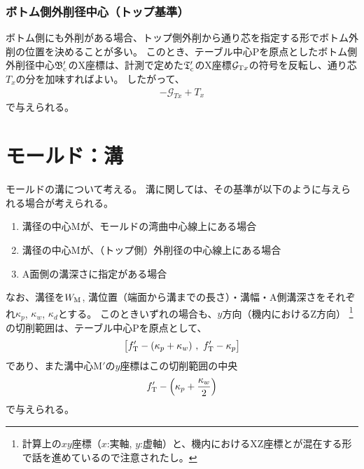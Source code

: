 \subsection{ボトム側外削径中心（トップ基準）}
ボトム側にも外削がある場合、トップ側外削から通り芯を指定する形でボトム外削の位置を決めることが多い。
このとき、テーブル中心Pを原点としたボトム側外削径中心$\mathfrak B_\text c'$のX座標は、計測で定めた$\mathfrak T_\text c'$のX座標$\mathcal G_{\text Tx}$の符号を反転し、通り芯$T_x$の分を加味すればよい。
したがって、
\begin{align*}
  -\mathcal G_{Tx}+T_x
\end{align*}
で与えられる。





\chapter{モールド：溝}
モールドの溝について考える。
溝に関しては、その基準が以下のように与えられる場合が考えられる。
\begin{enumerate}
\item 溝径の中心Mが、モールドの湾曲中心線上にある場合
\item 溝径の中心Mが、（トップ側）外削径の中心線上にある場合
\item A面側の溝深さに指定がある場合
\end{enumerate}
なお、溝径を$W_\text M$, 溝位置（端面から溝までの長さ）・溝幅・A側溝深さをそれぞれ$\kappa_p$, $\kappa_w$, $\kappa_d$とする。
このときいずれの場合も、$y$方向（機内におけるZ方向）
\footnote{計算上の$xy$座標（$x$:実軸, $y$:虚軸）と、機内におけるXZ座標とが混在する形で話を進めているので注意されたし。}\relax
の切削範囲は、テーブル中心Pを原点として、
\begin{align*}
  \big[f_\text T'-(\kappa_p+\kappa_w)\ ,\ f_\text T'-\kappa_p\big]
\end{align*}
であり、また溝中心M$'$の$y$座標はこの切削範囲の中央
\begin{align*}
  f_\text T'-\left(\kappa_p+\frac{\kappa_w}2\right)
\end{align*}
で与えられる。



